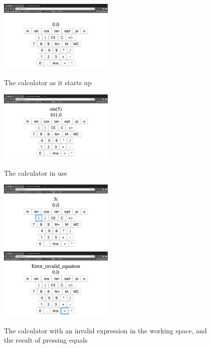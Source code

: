 \documentclass[12pt]{article}
\begin{document}
\begin{figure}[ht]
\centering
\caption{The calculator as it starts up}
\includegraphics[width=0.5\textwidth]{01.png}
  \label{fig:startup}
\end{figure}

\begin{figure}[ht]
\centering
\caption{The calculator in use}
\includegraphics[width=0.5\textwidth]{02.png}
  \label{fig:inuse}
\end{figure}

\begin{figure}[ht]
\centering
\caption{The calculator with an invalid expression in the working space, and the result of pressing equals}
\includegraphics[width=0.5\textwidth]{03-1.png}
\includegraphics[width=0.5\textwidth]{03-2.png}
  \label{fig:error}
\end{figure}
\end{document}
